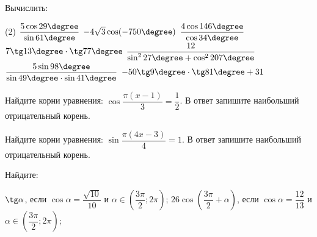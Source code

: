 \begin{homework}[number=1]
	\begin{listofex}
		\item Вычислить: %
		\begin{tasks}(2)
			\task \( \dfrac{5\cos29\degree}{\sin61\degree} \)
			\task \( -4\sqrt{3}\cos(-750\degree) \)
			\task \( \dfrac{4\cos146\degree}{\cos34\degree} \)
			\task \( 7\tg13\degree\cdot\tg77\degree \)
			\task \( \dfrac{12}{\sin^227\degree+\cos^2207\degree} \)
			\task \( \dfrac{5\sin98\degree}{\sin49\degree\cdot\sin41\degree} \)
			\task \( -50\tg9\degree\cdot\tg81\degree+31 \)
		\end{tasks}
		\item Найдите корни уравнения: \( \cos \dfrac{ \pi(x-1) }{ 3 }=\dfrac{  1}{ 2 } \).  В ответ запишите наибольший отрицательный корень.
		\item Найдите корни уравнения: \( \sin \dfrac{ \pi(4x-3) }{ 4 }=1 \).  В ответ запишите наибольший отрицательный корень.
		\item Найдите: %
		\begin{tasks}
			\task \( \tg \alpha \), если \( \cos \alpha = \dfrac{ \sqrt{10} }{ 10 } \) и \( \alpha\in\left( \dfrac{ 3\pi }{ 2 };2\pi \right) \);
			\task \( 26 \cos \left( \dfrac{ 3\pi }{ 2 }+\alpha \right) \), если \( \cos \alpha = \dfrac{ 12 }{ 13 } \) и \( \alpha\in\left( \dfrac{ 3\pi }{ 2 };2\pi \right) \);
		\end{tasks}
	\end{listofex}
\end{homework}


